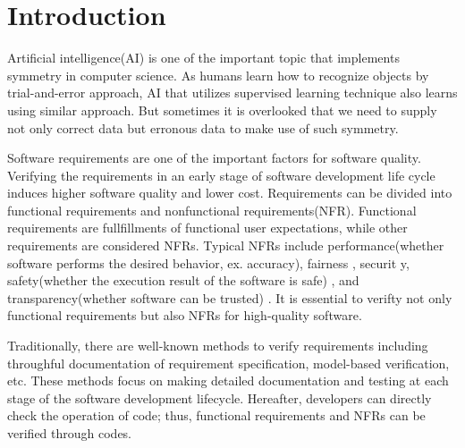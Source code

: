 \documentclass[symmetry,article,submit,moreauthors,pdftex]{Definitions/mdpi}
\begin{document}
\section{Introduction}


Artificial intelligence(AI) is one of the important topic that implements symmetry in computer science. As humans learn how to recognize objects by trial-and-error approach, AI that utilizes supervised learning technique also learns using similar approach. But sometimes it is overlooked that we need to supply not only correct data but erronous data to make use of such symmetry.

Software requirements are one of the important factors for software quality.
Verifying the requirements in an early stage of software development life cycle induces higher software quality and lower cost.
Requirements can be divided into functional requirements and nonfunctional requirements(NFR).
Functional requirements are fullfillments of functional user expectations, while other requirements are considered NFRs. Typical NFRs include performance(whether software performs the desired behavior, ex. accuracy), fairness \cite{fairness-microsoft, fairness-dwork, fairness-feldman, fairness-tramer, fairness-zhang, fairness-zemel}, securit y\cite{security-mei, security-mei2, security-barreno}, safety(whether the execution result of the software is safe)  \cite{safety-amodei,safety-juric,safety-leike}, and transparency(whether software can be trusted) \cite{transparency-yosinski,xai-transparency-ribeiro,xai-transparency-murdoch}.
It is essential to verifty not only functional requirements but also NFRs for high-quality software.

Traditionally, there are well-known methods to verify requirements including throughful documentation of requirement specification, model-based verification, etc. These methods focus on making detailed documentation and testing at each stage of the software development lifecycle. Hereafter, developers can directly check the operation of code; thus, functional requirements and NFRs can be verified through codes.
\end{document}
